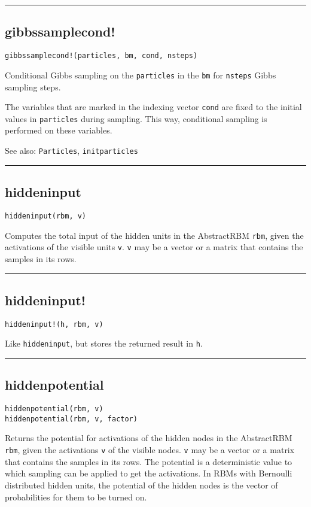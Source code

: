 \noindent\rule{\textwidth}{1pt}
\subsection*{gibbssamplecond!}  \label{bms_gibbssamplecond!}
\begin{verbatim}
gibbssamplecond!(particles, bm, cond, nsteps)
\end{verbatim}
Conditional Gibbs sampling on the \texttt{particles} in the \texttt{bm} for \texttt{nsteps} Gibbs sampling steps.

The variables that are marked in the indexing vector \texttt{cond} are fixed to the initial values in \texttt{particles} during sampling. This way, conditional sampling is performed on these variables.

See also: \texttt{Particles}, \texttt{initparticles}

\noindent\rule{\textwidth}{1pt}
\subsection*{hiddeninput}  \label{bms_hiddeninput}
\begin{verbatim}
hiddeninput(rbm, v)
\end{verbatim}
Computes the total input of the hidden units in the AbstractRBM \texttt{rbm}, given the activations of the visible units \texttt{v}. \texttt{v} may be a vector or a matrix that contains the samples in its rows.

\noindent\rule{\textwidth}{1pt}
\subsection*{hiddeninput!}  \label{bms_hiddeninput!}
\begin{verbatim}
hiddeninput!(h, rbm, v)
\end{verbatim}
Like \texttt{hiddeninput}, but stores the returned result in \texttt{h}.

\noindent\rule{\textwidth}{1pt}
\subsection*{hiddenpotential}  \label{bms_hiddenpotential}
\begin{verbatim}
hiddenpotential(rbm, v)
hiddenpotential(rbm, v, factor)
\end{verbatim}
Returns the potential for activations of the hidden nodes in the AbstractRBM \texttt{rbm}, given the activations \texttt{v} of the visible nodes. \texttt{v} may be a vector or a matrix that contains the samples in its rows. The potential is a deterministic value to which sampling can be applied to get the activations. In RBMs with Bernoulli distributed hidden units, the potential of the hidden nodes is the vector of probabilities for them to be turned on.

